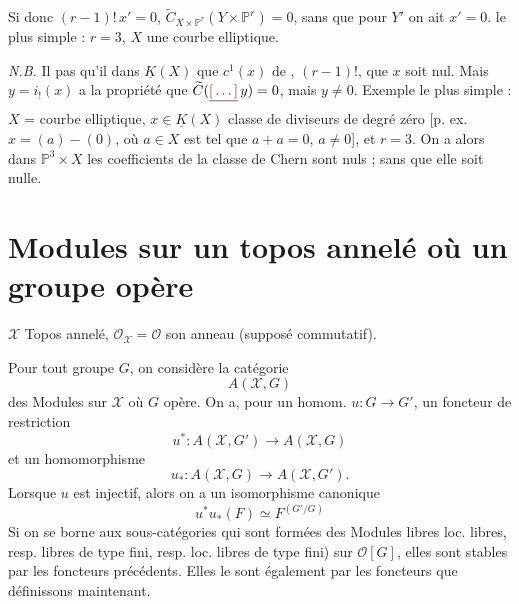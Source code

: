 \documentclass[11pt,a4paper]{article}
\begin{document}
Si donc $(r-1)!\,x' = 0$, \ill{} \ill{}
$\widetilde{C}_{X \times \mathbb{P}^{r}}(Y \times \mathbb{P}^{r}) = 0$,
sans que pour \ill{} $Y'$ on ait  $x' = 0$.
 le plus simple : $r = 3$, $X$ une courbe elliptique.


\emph{N.B.} Il  pas \ill{} qu'il \ill{} \ill{} dans
$\underline{K}(X)$ \ill{} que \ill{} $c^{1}(x)$  de
, \ill{} $(r-1)!$,  que $x$ soit nul. Mais
$y = i_{!}(x)$ a la propriété que $\widetilde{C}(\struck{\ill{}}\,y) = 0$,
mais $y \neq 0$. Exemple le plus simple :
$X$ = courbe elliptique, $x \in \underline{K}(X)$ \struck{\ill{}} classe de
diviseurs de degré zéro [p. ex. $x = (a) - (0)$, où $a \in X$ est tel que
$a + a = 0$, $a \neq 0$], et $r = 3$. On a alors dans $\mathbb{P}^{3} \times X$
les coefficients \ill{}  \ill{} \struck{\ill{}} \ill{} de la
classe de Chern sont nuls ; sans que elle soit nulle.

\section*{Modules sur un topos annelé où un groupe opère}


\struck{\ill{}} $\mathcal{X}$ Topos annelé, $\mathcal{O}_{\mathcal{X}} =
\mathcal{O}$ son anneau (supposé commutatif).

Pour tout groupe $G$, on considère la catégorie
\[
  A(\mathcal{X}, G)
\]
des Modules sur $\mathcal{X}$ où $G$ opère. On a, pour un homom.
$u : G \to G'$, un foncteur de restriction
\[
  u^{*} : A(\mathcal{X}, G') \longrightarrow A(\mathcal{X}, G)
\]
et un homomorphisme 
\[
  u_{*} : A(\mathcal{X}, G) \longrightarrow A(\mathcal{X}, G') .
\]
Lorsque $u$ est injectif, alors on a  un isomorphisme
 canonique
\[
  u^{*} u_{*}(F) \simeq F^{(G'/G)}
\]
Si on se borne aux sous-catégories qui sont formées des Modules libres
 loc. libres, resp. libres de type fini, resp. loc. libres
de type fini) sur $\mathcal{O}[G]$, elles sont stables par les foncteurs
précédents. Elles le sont également par les foncteurs que 
définissons maintenant.
\end{document}
